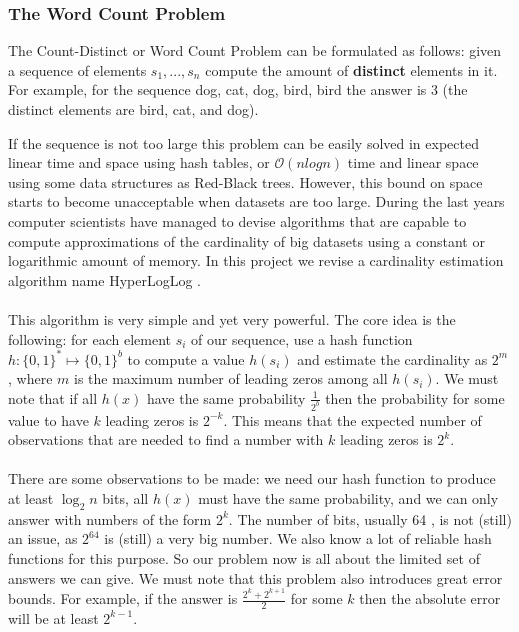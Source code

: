 \subsubsection{The Word Count Problem}
\label{subsec:wcountproblem}
The Count-Distinct or Word Count Problem can be formulated as follows: given a sequence of elements $s_{1}, ..., s_{n}$ compute the amount of \textbf{distinct} elements in it. For example, for the sequence dog, cat, dog, bird, bird the answer is 3 (the distinct elements are bird, cat, and dog).

If the sequence is not too large this problem can be easily solved in expected linear time and space using hash tables, or $\mathcal{O}(nlogn)$ time and linear space using some data structures as Red-Black trees. However, this bound on space starts to become unacceptable when datasets are too large. During the last years computer scientists have managed to devise algorithms that are capable to compute approximations of the cardinality of big datasets using a constant or logarithmic amount of memory. In this project we revise a cardinality estimation algorithm name HyperLogLog \cite{Flajolet07hyperloglog:the}.\\
\\
This algorithm is very simple and yet very powerful. The core idea is the following: for each element $s_{i}$ of our sequence, use a hash function $h: \{0, 1\}^{*} \mapsto \{0, 1\}^b$ to compute a value $h(s_{i})$ and estimate the cardinality as $2^m$, where $m$ is the maximum number of leading zeros among all $h(s_{i})$. We must note that if all $h(x)$ have the same probability $\frac{1}{2^{b}}$ then the probability for some value to have $k$ leading zeros is $2^{-k}$. This means that the expected number of observations that are needed to find a number with $k$ leading zeros is $2^{k}$.\\
\\
There are some observations to be made: we need our hash function to produce at least $\log_{2}{n}$ bits, all $h(x)$ must have the same probability, and we can only answer with numbers of the form $2^{k}$. The number of bits, usually 64 \cite{40671}, is not (still) an issue, as $2^{64}$ is (still) a very big number. We also know a lot of reliable hash functions for this purpose. So our problem now is all about the limited set of answers we can give. We must note that this problem also introduces great error bounds. For example, if the answer is $\frac{2^k + 2^{k+1}}{2}$ for some $k$ then the absolute error will be at least $2^{k - 1}$.\\
